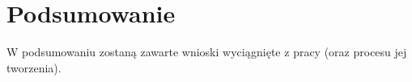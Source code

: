 \chapter{Podsumowanie}
\thispagestyle{chapterBeginStyle}

W podsumowaniu zostaną zawarte wnioski wyciągnięte z pracy (oraz procesu jej tworzenia).